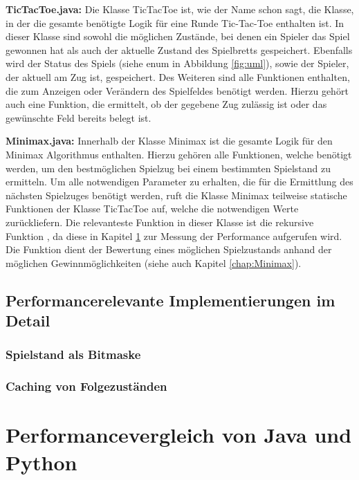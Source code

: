 \textbf{TicTacToe.java:} Die Klasse TicTacToe ist, wie der Name schon sagt, die Klasse, in der die gesamte benötigte Logik für eine Runde
Tic-Tac-Toe enthalten ist. In dieser Klasse sind sowohl die möglichen Zustände, bei denen ein Spieler das Spiel gewonnen hat als auch der
aktuelle Zustand des Spielbretts gespeichert. Ebenfalls wird der Status des Spiels (siehe enum in Abbildung \ref{fig:uml}), sowie der Spieler, der aktuell
am Zug ist, gespeichert. Des Weiteren sind alle Funktionen enthalten, die zum Anzeigen oder Verändern des Spielfeldes benötigt werden. Hierzu
gehört auch eine Funktion, die ermittelt, ob der gegebene Zug zulässig ist oder das gewünschte Feld bereits belegt ist.

\textbf{Minimax.java:} Innerhalb der Klasse Minimax ist die gesamte Logik für den Minimax Algorithmus enthalten. Hierzu gehören alle Funktionen,
welche benötigt werden, um den bestmöglichen Spielzug bei einem bestimmten Spielstand zu ermitteln. Um alle notwendigen Parameter zu erhalten,
die für die Ermittlung des nächsten Spielzuges benötigt werden, ruft die Klasse Minimax teilweise statische Funktionen der Klasse TicTacToe auf,
welche die notwendigen Werte zurückliefern. Die relevanteste Funktion in dieser Klasse ist die rekursive Funktion , 
da diese in Kapitel \ref{chap:performancevergleich} zur Messung der Performance aufgerufen wird. Die Funktion dient der Bewertung eines möglichen 
Spielzustands anhand der möglichen Gewinnmöglichkeiten (siehe auch Kapitel \ref{chap:Minimax}).

\subsection{Performancerelevante Implementierungen im Detail}
\label{chap:implementierungen}
\subsubsection{Spielstand als Bitmaske}

\subsubsection{Caching von Folgezuständen}

\section{Performancevergleich von Java und Python}
\label{chap:performancevergleich}

